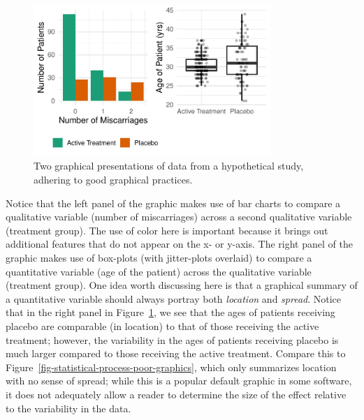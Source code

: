 \documentclass[
  letterpaper,
  DIV=11,
  numbers=noendperiod]{scrreprt}
\theoremstyle{definition}
\theoremstyle{definition}
\theoremstyle{remark}
\begin{document}
\begin{figure}

{\centering \includegraphics[width=0.8\textwidth,height=\textheight]{./images/fig-statistical-process-graphics-1.pdf}

}

\caption{\label{fig-statistical-process-graphics}Two graphical
presentations of data from a hypothetical study, adhering to good
graphical practices.}

\end{figure}

Notice that the left panel of the graphic makes use of bar charts to
compare a qualitative variable (number of miscarriages) across a second
qualitative variable (treatment group). The use of color here is
important because it brings out additional features that do not appear
on the x- or y-axis. The right panel of the graphic makes use of
box-plots (with jitter-plots overlaid) to compare a quantitative
variable (age of the patient) across the qualitative variable (treatment
group). One idea worth discussing here is that a graphical summary of a
quantitative variable should always portray both \emph{location} and
\emph{spread}. Notice that in the right panel in
Figure~\ref{fig-statistical-process-graphics}, we see that the ages of
patients receiving placebo are comparable (in location) to that of those
receiving the active treatment; however, the variability in the ages of
patients receiving placebo is much larger compared to those receiving
the active treatment. Compare this to
Figure~\ref{fig-statistical-process-poor-graphics}, which only
summarizes location with no sense of spread; while this is a popular
default graphic in some software, it does not adequately allow a reader
to determine the size of the effect relative to the variability in the
data.
\end{document}
